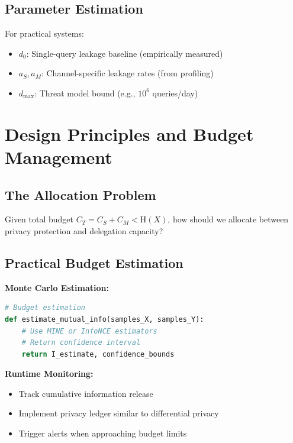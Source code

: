 \documentclass[11pt,a4paper]{article}
\theoremstyle{definition}
\newcommand{\Entropy}{\mathrm{H}}
\begin{document}
\subsection{Parameter Estimation}

For practical systems:

\begin{itemize}
    \item $d_0$: Single-query leakage baseline (empirically measured)
    \item $a_S, a_M$: Channel-specific leakage rates (from profiling)
    \item $d_{\max}$: Threat model bound (e.g., $10^6$ queries/day)
\end{itemize}

\section{Design Principles and Budget Management}

\subsection{The Allocation Problem}

Given total budget $C_T = C_S + C_M < \Entropy(X)$, how should we allocate between privacy protection and delegation capacity?

\subsection{Practical Budget Estimation}

\textbf{Monte Carlo Estimation:}

\begin{lstlisting}[language=Python, caption=Budget estimation]
# Budget estimation
def estimate_mutual_info(samples_X, samples_Y):
    # Use MINE or InfoNCE estimators
    # Return confidence interval
    return I_estimate, confidence_bounds
\end{lstlisting}

\textbf{Runtime Monitoring:}

\begin{itemize}
    \item Track cumulative information release
    \item Implement privacy ledger similar to differential privacy
    \item Trigger alerts when approaching budget limits
\end{itemize}
\end{document}
